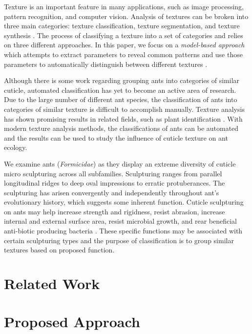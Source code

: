 \documentclass{aci}
\begin{document}
Texture is an important feature in many applications, such as image processing,
pattern recognition, and computer vision. Analysis of textures can be broken
into three main categories: texture classification, texture segmentation, and
texture synthesis \cite{reed_review_1993}. The process of classifying a texture
into a set of categories and relies on three different approaches. In this
paper, we focus on a \textit{model-based approach} which attempts to extract
parameters to reveal common patterns and use those parameters to automatically
distinguish between different textures \cite{maillard_texture_2003}.

Although there is some work regarding grouping ants into categories of similar
cuticle, automated classification has yet to become an active area of research.
Due to the large number of different ant species, the classification of ants
into categories of similar texture is difficult to accomplish manually. Texture
analysis has shown promising results in related fields, such as plant
identification \cite{boudra_plant_2018}. With modern texture analysis methods,
the classifications of ants can be automated and the results can be used to
study the influence of cuticle texture on ant ecology.

We examine ants (\textit{Formicidae}) as they display an extreme diversity of
cuticle micro sculpturing across all subfamilies. Sculpturing ranges from
parallel longitudinal ridges to deep oval impressions to erratic protuberances.
The sculpturing has arisen convergently and independently throughout ant’s
evolutionary history, which suggests some inherent function. Cuticle sculpturing
on ants may help increase strength and rigidness, resist abrasion, increase
internal and external surface area, resist microbial growth, and rear beneficial
anti-biotic producing bacteria \cite{johnson_effect_2011,
  bruckner_relationship_2017, currie_coevolved_2006}. These specific functions may
be associated with certain sculpturing types and the purpose of classification
is to group similar textures based on proposed function.

\section{Related Work}

\section{Proposed Approach}
\end{document}
